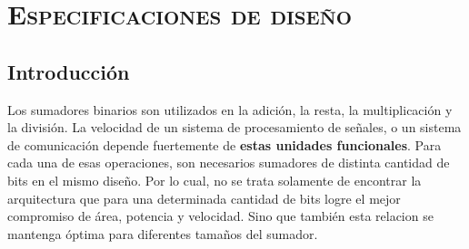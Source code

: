 





\chapter{ \textsc{ Especificaciones de diseño} }\label{especificaciones}

\section{Introducción}
Los sumadores binarios son utilizados en la adición, la resta, la multiplicación y la división. La velocidad de un sistema de procesamiento de señales, o un sistema de comunicación depende fuertemente de \textbf{estas unidades funcionales\cite{rabaey2003}}. Para cada una de esas operaciones, son necesarios sumadores de distinta cantidad de bits en el mismo diseño. Por lo cual, no se trata solamente de encontrar la arquitectura que para una determinada cantidad de bits logre el mejor compromiso de área, potencia y velocidad. Sino que también esta relacion se mantenga óptima para diferentes tamaños del sumador. 

